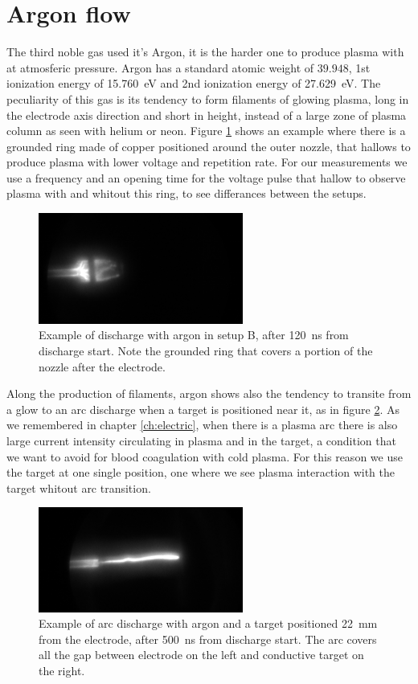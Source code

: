 \section{Argon flow}
The third noble gas used it's Argon, it is the harder one to produce plasma with at atmosferic pressure. Argon has a standard atomic weight of $\num{39.948}$, 1st ionization energy of \SI{15.760}{\electronvolt} and 2nd ionization energy of \SI{27.629}{\electronvolt}.
The peculiarity of this gas is its tendency to form filaments of glowing plasma, long in the electrode axis direction and short in height, instead of a large zone of plasma column as seen with helium or neon. Figure \ref{fig:argonex} shows an example where there is a grounded ring made of copper positioned around the outer nozzle, that hallows to produce plasma with lower voltage and repetition rate. For our measurements we use a frequency and an opening time for the voltage pulse that hallow to observe plasma with and whitout this ring, to see differances between the setups.
\begin{figure}
 \centering
 \includegraphics[width=0.6\textwidth]{Images/Shape/argon_b_120.png}
 \caption{Example of discharge with argon in setup B, after \SI{120}{\nano\second} from discharge start. Note the grounded ring that covers a portion of the nozzle after the electrode.}
 \label{fig:argonex}
\end{figure}


Along the production of filaments, argon shows also the tendency to transite from a glow to an arc discharge when a target is positioned near it, as in figure \ref{fig:arcex}. As we remembered in chapter \ref{ch:electric}, when there is a plasma arc there is also large current intensity circulating in plasma and in the target, a condition that we want to avoid for blood coagulation with cold plasma. For this reason we use the target at one single position, one where we see plasma interaction with the target whitout arc transition.
\begin{figure}
 \centering
 \includegraphics[width=0.6\textwidth]{Images/Shape/arcex.png}
 \caption{Example of arc discharge with argon and a target positioned \SI{22}{\milli\meter} from the electrode, after \SI{500}{\nano\second} from discharge start. The arc covers all the gap between electrode on the left and conductive target on the right.}
 \label{fig:arcex}
\end{figure}

